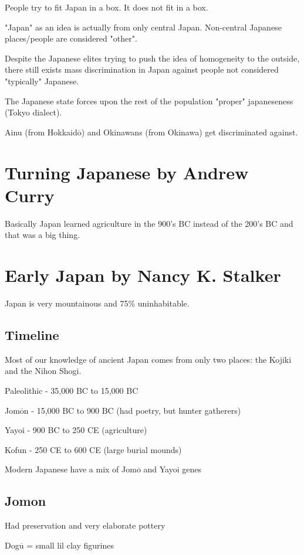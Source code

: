 \documentclass{report}
\newcommand{\textoverline}[1]{$\overline{\mbox{#1}}$}
\begin{document}
People try to fit Japan in a box. It does not fit in a box.

"Japan" as an idea is actually from only central Japan. Non-central Japanese places/people are considered "other".

Despite the Japanese elites trying to push the idea of homogeneity to the outside, there still exists mass discrimination in Japan against people not considered "typically" Japanese. 






The Japanese state forces upon the rest of the population "proper" japaneseness (Tokyo dialect).

Ainu (from Hokkaid$\overline{\mbox{o}}$) and Okinawans (from Okinawa) get discriminated against. 

\chapter{Turning Japanese by Andrew Curry}
Basically Japan learned agriculture in the 900's BC instead of the 200's BC and that was a big thing.


\chapter{Early Japan by Nancy K. Stalker}
Japan is very mountainous and 75\% uninhabitable.

\section*{Timeline}
Most of our knowledge of ancient Japan comes from only two places: the Kojiki and the Nihon Shogi.

\indent Paleolithic - 35,000 BC to 15,000 BC

Jom\textoverline{o}n - 15,000 BC to 900 BC (had poetry, but hunter gatherers)

Yayoi - 900 BC to 250 CE (agriculture)

Kofun - 250 CE to 600 CE (large burial mounds)

Modern Japanese have a mix of Jom\textoverline{o} and Yayoi genes

\section{Jomon}
Had preservation and very elaborate pottery

Dog\textoverline{u} = small lil clay figurines
\end{document}

